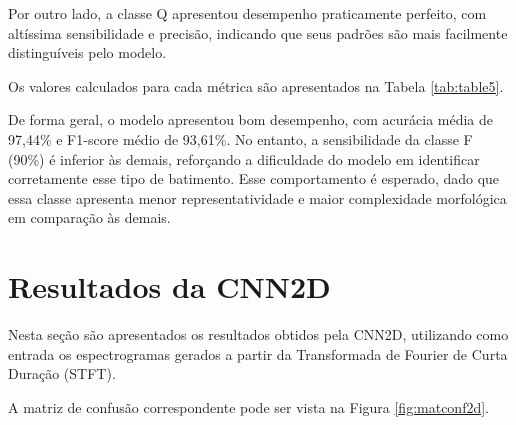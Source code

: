 Por outro lado, a classe Q apresentou desempenho praticamente perfeito, com altíssima sensibilidade e precisão, indicando que seus padrões são mais 
facilmente distinguíveis pelo modelo.

Os valores calculados para cada métrica são apresentados na Tabela \ref{tab:table5}.

\begin{table}[ht]
  \caption{Métricas de desempenho da CNN1D}
  \label{tab:table5}
  \centering
  \source
\end{table}

De forma geral, o modelo apresentou bom desempenho, com acurácia média de 97,44\% e F1-score médio de 93,61\%. No entanto, a sensibilidade da classe 
F (90\%) é inferior às demais, reforçando a dificuldade do modelo em identificar corretamente esse tipo de batimento. Esse comportamento é esperado, 
dado que essa classe apresenta menor representatividade e maior complexidade morfológica em comparação às demais.

\section{Resultados da CNN2D}

Nesta seção são apresentados os resultados obtidos pela CNN2D, utilizando como entrada os espectrogramas gerados a partir da Transformada de 
Fourier de Curta Duração (STFT).

A matriz de confusão correspondente pode ser vista na Figura \ref{fig:matconf2d}.

